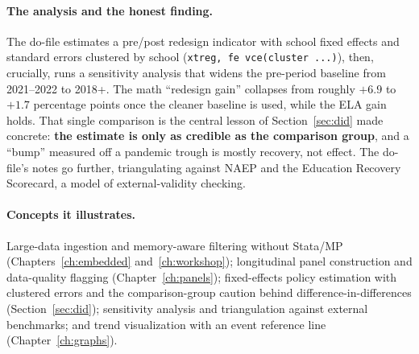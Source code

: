 \documentclass[
    a4paper,
    fontsize=10pt,
    twoside=true,
    numbers=noenddot,
]{kaobook}
\begin{document}
\paragraph{The analysis and the honest finding.} The do-file estimates a pre/post redesign indicator with school fixed effects and standard errors clustered by school (\texttt{xtreg, fe vce(cluster ...)}), then, crucially, runs a sensitivity analysis that widens the pre-period baseline from 2021--2022 to 2018+. The math \enquote{redesign gain} collapses from roughly $+6.9$ to $+1.7$ percentage points once the cleaner baseline is used, while the ELA gain holds. That single comparison is the central lesson of Section~\ref{sec:did} made concrete: \textbf{the estimate is only as credible as the comparison group}, and a \enquote{bump} measured off a pandemic trough is mostly recovery, not effect. The do-file's notes go further, triangulating against NAEP and the Education Recovery Scorecard, a model of external-validity checking.

\paragraph{Concepts it illustrates.} Large-data ingestion and memory-aware filtering without Stata/MP (Chapters~\ref{ch:embedded} and~\ref{ch:workshop}); longitudinal panel construction and data-quality flagging (Chapter~\ref{ch:panels}); fixed-effects policy estimation with clustered errors and the comparison-group caution behind difference-in-differences (Section~\ref{sec:did}); sensitivity analysis and triangulation against external benchmarks; and trend visualization with an event reference line (Chapter~\ref{ch:graphs}).

\backmatter
\printbibliography[heading=bibintoc, title=Bibliography]
\end{document}
